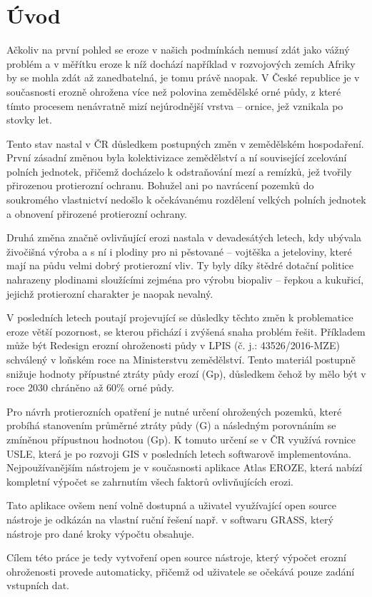 \chapter{Úvod}

Ačkoliv na první pohled se eroze v našich podmínkách nemusí zdát jako
vážný problém a v měřítku eroze k níž dochází například v rozvojových
zemích Afriky by se mohla zdát až zanedbatelná, je tomu právě
naopak. V České republice je v současnosti erozně ohrožena více než
polovina zemědělské orné půdy, z které tímto procesem nenávratně mizí
nejúrodnější vrstva – ornice, jež vznikala po stovky let.

Tento stav nastal v ČR důsledkem postupných změn v zemědělském
hospodaření. První zásadní změnou byla kolektivizace zemědělství a ní
související zcelování polních jednotek, přičemž docházelo k
odstraňování mezí a remízků, jež tvořily přirozenou protierozní
ochranu. Bohužel ani po navrácení pozemků do soukromého vlastnictví
nedošlo k očekávanému rozdělení velkých polních jednotek a obnovení
přirozené protierozní ochrany.

Druhá změna značně ovlivňující erozi nastala v devadesátých letech,
kdy ubývala živočišná výroba a s ní i plodiny pro ni pěstované –
vojtěška a jeteloviny, které mají na půdu velmi dobrý protierozní
vliv. Ty byly díky štědré dotační politice nahrazeny plodinami
sloužícími zejména pro výrobu biopaliv – řepkou a kukuřicí, jejichž
protierozní charakter je naopak nevalný.

V posledních letech poutají projevující se důsledky těchto změn k
problematice eroze větší pozornost, se kterou přichází i zvýšená snaha
problém řešit. Příkladem může být Redesign erozní ohroženosti půdy v
LPIS (č. j.: 43526/2016-MZE) schválený v loňském roce na Ministerstvu
zemědělství. Tento materiál postupně snižuje hodnoty přípustné ztráty
půdy erozí (Gp), důsledkem čehož by mělo být v roce 2030 chráněno až
60\% orné půdy.

Pro návrh protierozních opatření je nutné určení ohrožených pozemků,
které probíhá stanovením průměrné ztráty půdy (G) a následným
porovnáním se zmíněnou přípustnou hodnotou (Gp). K tomuto určení se v
ČR využívá rovnice USLE, která je po rozvoji GIS v posledních letech
softwarově implementována. Nejpoužívanějším nástrojem je v současnosti
aplikace Atlas EROZE, která nabízí kompletní výpočet se zahrnutím
všech faktorů ovlivňujících erozi.

Tato aplikace ovšem není volně dostupná a uživatel využívající open
source nástroje je odkázán na vlastní ruční řešení např. v softwaru
GRASS, který nástroje pro dané kroky výpočtu obsahuje.

Cílem této práce je tedy vytvoření open source nástroje, který výpočet
erozní ohroženosti provede automaticky, přičemž od uživatele se
očekává pouze zadání vstupních dat.
